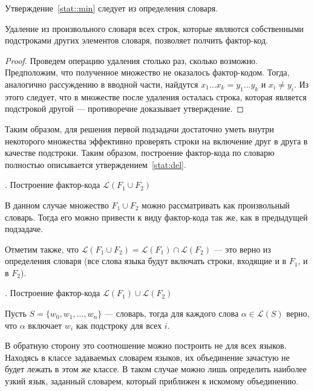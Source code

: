 \documentclass[14pt, russian]{scrartcl}
\newcommand{\Lang}{\ensuremath{\mathcal{L}}}
\begin{document}
Утверждение~\ref{stat::min} следует из определения словаря.

\begin{Statement}
\label{stat:del}
Удаление из произвольного словаря всех строк, которые являются собственными подстроками других элементов словаря, позволяет полчить фактор-код.     
\end{Statement}
\begin{proof}
    Проведем операцию удаления столько раз, сколько возможно. Предположим, что полученное множество не оказалось фактор-кодом.
    \newline
    Тогда, аналогично рассуждению в вводной части, найдутся $ x_1...x_k = y_1...y_k  $ и $x_i \neq y_i$. Из этого следует, что в множестве после удаления осталась строка, которая является подстрокой другой --- противоречие доказывает утверждение.
\end{proof}

Таким образом, для решения первой подзадачи достаточно уметь внутри некоторого множества эффективно проверять строки на включение друг в друга в качестве подстроки. Таким образом, построение фактор-кода по словарю полностью описывается утверждением~\ref {stat:del}.

\vspace{10pt}

{. Построение фактор-кода $\Lang(F_1 \cup F_2)$

}

\vspace{4pt}

В данном случае множество $F_1\cup F_2$ можно рассматривать как произвольный словарь. Тогда его можно привести к виду фактор-кода так же, как в предыдущей подзадаче.

Отметим также, что $\Lang(F_1 \cup F_2) = \Lang(F_1) \cap \Lang(F_2)$ --- это верно из определения словаря (все слова языка будут включать строки, входящие и в $F_1$, и в $F_2$).


\vspace{10pt}
{. Построение фактор-кода $\Lang(F_1) \cup \Lang(F_2)$

}

\vspace{4pt}

Пусть $S = \{w_0, w_1, ..., w_n\}$ --- словарь, тогда для каждого слова $\alpha \in \Lang(S)$ верно, что $\alpha$ включает $w_i$ как подстроку для всех $i$.

В обратную сторону это соотношение можно построить не для всех языков. Находясь в классе задаваемых словарем языков, их объединение зачастую не будет лежать в этом же классе. В таком случае можно лишь определить наиболее узкий язык, заданный словарем, который приближен к искомому объединению.
\end{document}
